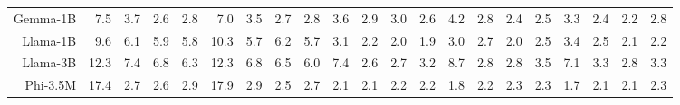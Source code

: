 \begin{table}[t]
{\begin{tabular}{rrrrr|rrrr|rrrr|rrrr|rrrr}
Gemma-1B & \cellcolor[HTML]{FDEACC}7.5 & \cellcolor[HTML]{FAD8CC}3.7 & \cellcolor[HTML]{F9D3CC}2.6 & \cellcolor[HTML]{F9D4CC}2.8 & \cellcolor[HTML]{FDE7CC}7.0 & \cellcolor[HTML]{FAD7CC}3.5 & \cellcolor[HTML]{F9D3CC}2.7 & \cellcolor[HTML]{F9D4CC}2.8 & \cellcolor[HTML]{FDE6CC}3.6 & \cellcolor[HTML]{FCE0CC}2.9 & \cellcolor[HTML]{FCE1CC}3.0 & \cellcolor[HTML]{FBDDCC}2.6 & \cellcolor[HTML]{FDE8CC}4.2 & \cellcolor[HTML]{FBDFCC}2.8 & \cellcolor[HTML]{FBDBCC}2.4 & \cellcolor[HTML]{FBDCCC}2.5 & \cellcolor[HTML]{FCE3CC}3.3 & \cellcolor[HTML]{FBDCCC}2.4 & \cellcolor[HTML]{FBDACC}2.2 & \cellcolor[HTML]{FCDFCC}2.8 \\
Llama-1B & \cellcolor[HTML]{FDF2CC}9.6 & \cellcolor[HTML]{FCE3CC}6.1 & \cellcolor[HTML]{FCE2CC}5.9 & \cellcolor[HTML]{FCE2CC}5.8 & \cellcolor[HTML]{FBF1CC}10.3 & \cellcolor[HTML]{FCE1CC}5.7 & \cellcolor[HTML]{FCE3CC}6.2 & \cellcolor[HTML]{FCE1CC}5.7 & \cellcolor[HTML]{FCE1CC}3.1 & \cellcolor[HTML]{FAD9CC}2.2 & \cellcolor[HTML]{FAD8CC}2.0 & \cellcolor[HTML]{FAD7CC}1.9 & \cellcolor[HTML]{FCE0CC}3.0 & \cellcolor[HTML]{FBDECC}2.7 & \cellcolor[HTML]{FAD8CC}2.0 & \cellcolor[HTML]{FBDCCC}2.5 & \cellcolor[HTML]{FCE4CC}3.4 & \cellcolor[HTML]{FBDDCC}2.5 & \cellcolor[HTML]{FBDACC}2.1 & \cellcolor[HTML]{FBDBCC}2.2 \\
Llama-3B & \cellcolor[HTML]{EDEECC}12.3 & \cellcolor[HTML]{FDE9CC}7.4 & \cellcolor[HTML]{FDE6CC}6.8 & \cellcolor[HTML]{FCE4CC}6.3 & \cellcolor[HTML]{EFEFCC}12.3 & \cellcolor[HTML]{FDE6CC}6.8 & \cellcolor[HTML]{FDE4CC}6.5 & \cellcolor[HTML]{FCE2CC}6.0 & \cellcolor[HTML]{E3ECCC}7.4 & \cellcolor[HTML]{FBDDCC}2.6 & \cellcolor[HTML]{FBDDCC}2.7 & \cellcolor[HTML]{FCE2CC}3.2 & \cellcolor[HTML]{E0ECCC}8.7 & \cellcolor[HTML]{FBDECC}2.8 & \cellcolor[HTML]{FBDFCC}2.8 & \cellcolor[HTML]{FCE4CC}3.5 & \cellcolor[HTML]{E9EECC}7.1 & \cellcolor[HTML]{FCE3CC}3.3 & \cellcolor[HTML]{FCE0CC}2.8 & \cellcolor[HTML]{FCE4CC}3.3 \\
Phi-3.5M & \cellcolor[HTML]{CEE8CC}17.4 & \cellcolor[HTML]{F9D4CC}2.7 & \cellcolor[HTML]{F9D3CC}2.6 & \cellcolor[HTML]{FAD4CC}2.9 & \cellcolor[HTML]{CEE8CC}17.9 & \cellcolor[HTML]{FAD4CC}2.9 & \cellcolor[HTML]{F9D3CC}2.5 & \cellcolor[HTML]{F9D4CC}2.7 & \cellcolor[HTML]{FAD8CC}2.1 & \cellcolor[HTML]{FAD9CC}2.1 & \cellcolor[HTML]{FBDACC}2.2 & \cellcolor[HTML]{FBDACC}2.2 & \cellcolor[HTML]{FAD7CC}1.8 & \cellcolor[HTML]{FBDACC}2.2 & \cellcolor[HTML]{FBDBCC}2.3 & \cellcolor[HTML]{FBDBCC}2.3 & \cellcolor[HTML]{FAD7CC}1.7 & \cellcolor[HTML]{FBDACC}2.1 & \cellcolor[HTML]{FBDACC}2.1 & \cellcolor[HTML]{FBDCCC}2.3 \\

\end{tabular}}
\end{table}
